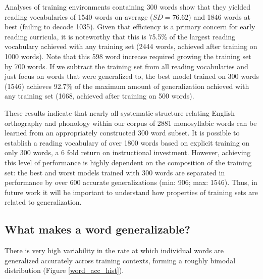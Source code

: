 \documentclass[10pt,letterpaper]{article}
\begin{document}
Analyses of training environments containing 300 words show that they yielded reading vocabularies of 1540 words on average ($SD = 76.62$) and 1846 words at best (failing to decode 1035). Given that efficiency is a primary concern for early reading curricula, it is noteworthy that this is 75.5\% of the largest reading vocabulary achieved with any training set (2444 words, achieved after training on 1000 words). Note that this 598 word increase required growing the training set by 700 words. If we subtract the training set from all reading vocabularies and just focus on words that were generalized to, the best model trained on 300 words (1546) achieves 92.7\% of the maximum amount of generalization achieved with any training set (1668, achieved after training on 500 words).

These results indicate that nearly all systematic structure relating English orthography and phonology within our corpus of 2881 monosyllabic words can be learned from an appropriately constructed 300 word subset. It is possible to establish a reading vocabulary of over 1800 words based on explicit training on only 300 words, a 6 fold return on instructional investment. However, achieving this level of performance is highly dependent on the composition of the training set: the best and worst models trained with 300 words are separated in performance by over 600 accurate generalizations (min: 906; max: 1546). Thus, in future work it will be important to understand how properties of training sets are related to generalization.   

\subsection{What makes a word generalizable?}
There is very high variability in the rate at which individual words are generalized accurately across training contexts, forming a roughly bimodal distribution (Figure \ref{word_acc_hist}).
\end{document}
